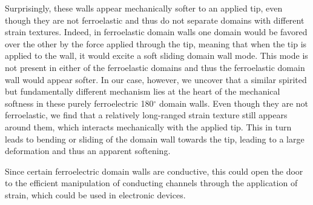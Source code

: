 Surprisingly, these walls appear mechanically softer to an applied tip, even though they are not ferroelastic and thus do not separate domains with different strain textures.
Indeed, in ferroelastic domain walls one domain would be favored over the other by the force applied through the tip, meaning that when the tip is applied to the wall, it would excite a soft sliding domain wall mode.
This mode is not present in either of the ferroelastic domains and thus the ferroelastic domain wall would appear softer.
In our case, however, we uncover that a similar spirited but fundamentally different mechanism lies at the heart of the mechanical softness in these purely ferroelectric 180$^\circ$ domain walls.
Even though they are not ferroelastic, we find that a relatively long-ranged strain texture still appears around them, which interacts mechanically with the applied tip.
This in turn leads to bending or sliding of the domain wall towards the tip, leading to a large deformation and thus an apparent softening.

Since certain ferroelectric domain walls are conductive, this could open the door to the efficient manipulation of conducting channels through the application of strain, which could be used in electronic devices.
